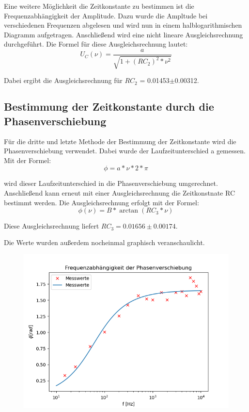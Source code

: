 Eine weitere Möglichkeit die Zeitkonstante zu bestimmen ist die Frequenzabhängigkeit der Amplitude. Dazu wurde die Ampltude bei verschiedenen Frequenzen abgelesen und wird nun in einem halblogarithmischen Diagramm aufgetragen. Anschließend wird eine nicht lineare Ausgleichsrechnung durchgeführt. Die Formel für diese Ausgleichsrechnung lautet:
\begin{displaymath}
    U_C(\nu) = \frac{a}{\sqrt{1+(RC_2)^2*\nu^2}}
\end{displaymath}

\noindent Dabei ergibt die Ausgleichsrechnung für $RC_2$ = 0.01453$\pm$0.00312.

\subsection{Bestimmung der Zeitkonstante durch die Phasenverschiebung}

Für die dritte und letzte Methode der Bestimmung der Zeitkonstante wird die Phasenverschiebung verwendet. Dabei wurde der Laufzeitunterschied a gemessen. Mit der Formel:
\begin{displaymath}
    \phi = a * \nu * 2*\pi
\end{displaymath}

\noindent wird dieser Laufzeitunterschied in die Phasenverschiebung umgerechnet. Anschließend kann erneut mit einer Ausgleichsrechnung die Zeitkonstnate RC bestimmt werden. Die Ausgleichsrechnung erfolgt mit der Formel:
\begin{displaymath}
    \phi(\nu) = B * \arctan(RC_3*\nu)
\end{displaymath} 

Diese Ausgleichsrechnung liefert $RC_3 = 0.01656 \pm 0.00174$.

Die Werte wurden außerdem nocheinmal graphisch veranschaulicht.

\begin{figure}[H]
    \centering
    \includegraphics{3.png}
\end{figure}

